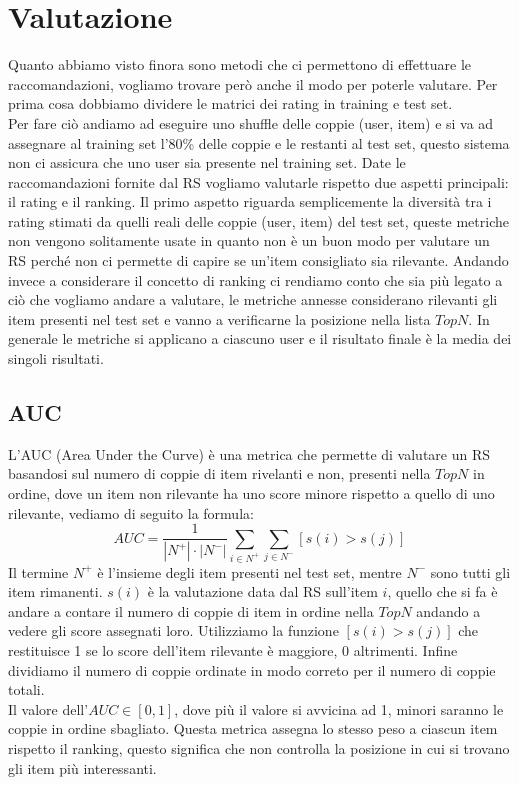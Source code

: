\section{Valutazione}
Quanto abbiamo visto finora sono metodi che ci permettono di effettuare le raccomandazioni, vogliamo trovare però anche il modo per poterle valutare. Per prima cosa dobbiamo dividere le matrici dei rating in training e test set.\\
Per fare ciò andiamo ad eseguire uno shuffle delle coppie (user, item) e si va ad assegnare al training set l'80\% delle coppie e le restanti al test set, questo sistema non ci assicura che uno user sia presente nel training set.
Date le raccomandazioni fornite dal RS vogliamo valutarle rispetto due aspetti principali: il rating e il ranking.
Il primo aspetto riguarda semplicemente la diversità tra i rating stimati da quelli reali delle coppie (user, item) del test set, queste metriche non vengono solitamente usate in quanto non è un buon modo per valutare un RS perché non ci permette di capire se un'item consigliato sia rilevante.
Andando invece a considerare il concetto di ranking ci rendiamo conto che sia più legato a ciò che vogliamo andare a valutare, le metriche annesse considerano rilevanti gli item presenti nel test set e vanno a verificarne la posizione nella lista $TopN$.
In generale le metriche si applicano a ciascuno user e il risultato finale è la media dei singoli risultati.

\subsection{AUC}
L'AUC (Area Under the Curve) è una metrica che permette di valutare un RS basandosi sul numero di coppie di item rivelanti e non, presenti nella $TopN$ in ordine, dove un item non rilevante ha uno score minore rispetto a quello di uno rilevante, vediamo di seguito la formula:
$$AUC = \frac{1}{|N^{+}|\cdot|N^{-}|}\sum_{i \in N^{+}} \sum_{j \in N^{-}} [s(i) > s(j)]$$
Il termine $N^{+}$ è l'insieme degli item presenti nel test set, mentre $N^{-}$ sono tutti gli item rimanenti. $s(i)$ è la valutazione data dal RS sull'item $i$, quello che si fa è andare a contare il numero di coppie di item in ordine nella $TopN$ andando a vedere gli score assegnati loro.
Utilizziamo la funzione $[s(i) > s(j)]$ che restituisce 1 se lo score dell'item rilevante è maggiore, 0 altrimenti. Infine dividiamo il numero di coppie ordinate in modo correto per il numero di coppie totali.\\
Il valore dell'$AUC \in [0,1]$, dove più il valore si avvicina ad 1, minori saranno le coppie in ordine sbagliato.
Questa metrica assegna lo stesso peso a ciascun item rispetto il ranking, questo significa che non controlla la posizione in cui si trovano gli item più interessanti.

